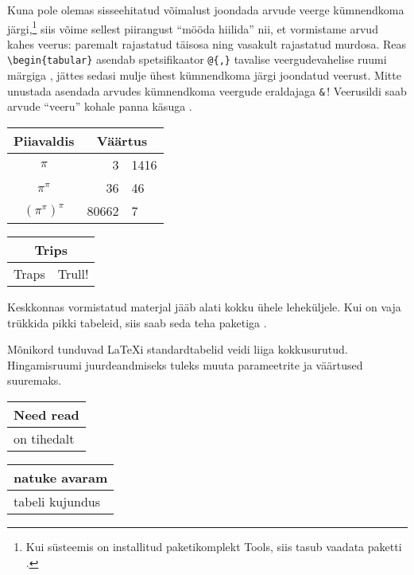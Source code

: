 %
%

 Kuna pole olemas sisseehitatud
võimalust joondada arvude veerge kümnendkoma järgi,\footnote{Kui
süsteemis on installitud paketikomplekt Tools, siis tasub vaadata
paketti .} siis võime sellest piirangust "`mööda hiilida"'
nii, et vormistame arvud kahes veerus: paremalt rajastatud täisosa ning
vasakult rajastatud murdosa. Reas \verb|\begin{tabular}| asendab
spetsifikaator \verb|@{,}| tavalise veergudevahelise ruumi märgiga
, jättes sedasi mulje ühest kümnendkoma järgi joondatud veerust.
Mitte unustada asendada arvudes kümnendkoma veergude eraldajaga
\verb|&|\,! Veerusildi saab arvude "`veeru"' kohale panna käsuga
.

\begin{example}
\begin{tabular}{c r @{,} l}
Piiavaldis          &
\multicolumn{2}{c}{Väärtus} \\
\hline
$\pi$               & 3&1416  \\
$\pi^{\pi}$         & 36&46   \\
$(\pi^{\pi})^{\pi}$ & 80662&7 \\
\end{tabular}
\end{example}

\begin{example}
\begin{tabular}{|c|c|}
\hline
\multicolumn{2}{|c|}{Trips} \\
\hline
Traps & Trull! \\
\hline
\end{tabular}
\end{example}

Keskkonnas  vormistatud materjal jääb alati kokku ühele
leheküljele. Kui on vaja trükkida pikki tabeleid, siis saab seda teha
paketiga .

Mõnikord tunduvad \LaTeX i standardtabelid veidi liiga kokkusurutud.
Hingamisruumi juurdeandmiseks tuleks muuta parameetrite
 ja  väärtused suuremaks.

\begin{example}
\begin{tabular}{|l|}
\hline
Need read\\\hline
on tihedalt\\\hline
\end{tabular}

{\renewcommand{\arraystretch}{1.5}
\renewcommand{\tabcolsep}{0.2cm}
\begin{tabular}{|l|}
\hline
natuke avaram\\\hline
tabeli kujundus\\\hline
\end{tabular}}
\end{example}

